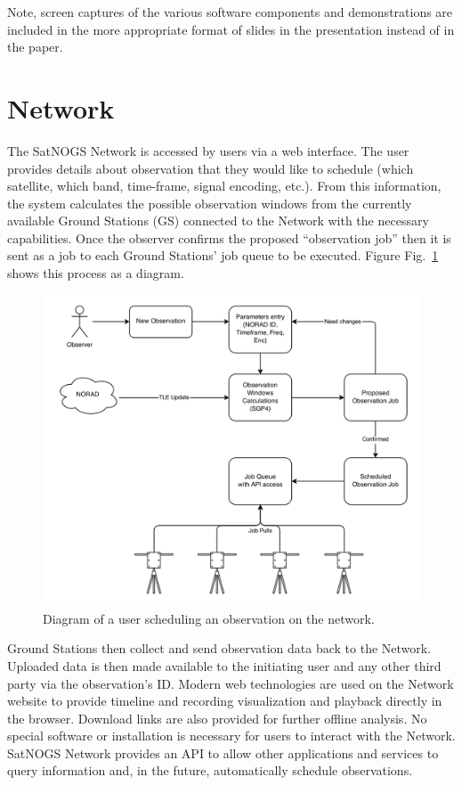 \documentclass[conference]{IEEEtran}
\newcommand{\figref}[1]{Fig.~\ref{#1}}
\begin{document}
Note, screen captures of the various software components and demonstrations are included in the more appropriate format of slides in the presentation instead of in the paper.


\section{Network}
The SatNOGS Network is accessed by users via a web interface.
The user provides details about observation that they would like to schedule (which satellite, which band, time-frame, signal encoding, etc.).
From this information, the system calculates the possible observation windows from the currently available Ground Stations (GS) connected to the Network with the necessary capabilities.
Once the observer confirms the proposed ``observation job'' then it is sent as a job to each Ground Stations' job queue to be executed.
Figure \figref{f:network} shows this process as a diagram.

\begin{figure}[htbp]
\centering
\includegraphics[width=\columnwidth]{fig/network-flow}
\caption{Diagram of a user scheduling an observation on the network.}
\label{f:network}
\end{figure}

Ground Stations then collect and send observation data back to the Network.
Uploaded data is then made available to the initiating user and any other third party via the observation's ID.
Modern web technologies are used on the Network website to provide timeline and recording visualization and playback directly in the browser.
Download links are also provided for further offline analysis.
No special software or installation is necessary for users to interact with the Network.
SatNOGS Network provides an API to allow other applications and services to query information and, in the future, automatically schedule observations.
\end{document}
